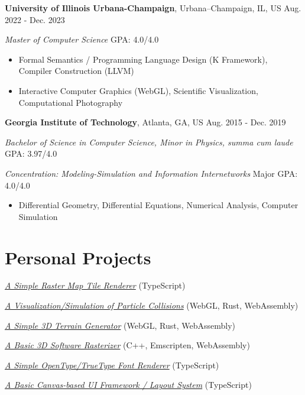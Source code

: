 \documentclass[11pt]{article}
\begin{document}
\textbf{University of Illinois Urbana-Champaign}, Urbana–Champaign, IL, US \hfill Aug. 2022 - Dec. 2023 

\textit{Master of Computer Science}  \hfill GPA: 4.0/4.0 

\begin{itemize}
\item Formal Semantics / Programming Language Design (K Framework), Compiler Construction (LLVM)
\item Interactive Computer Graphics (WebGL), Scientific Visualization, Computational Photography
\end{itemize}

\textbf{Georgia Institute of Technology}, Atlanta, GA, US \hfill Aug. 2015 - Dec. 2019

\textit{Bachelor of Science in Computer Science, Minor in Physics, \textit{summa cum laude}} \hfill GPA: 3.97/4.0

\textit{Concentration: Modeling-Simulation and Information Internetworks} \hfill Major GPA: 4.0/4.0

\begin{itemize}
\item Differential Geometry, Differential Equations, Numerical Analysis, Computer Simulation
\end{itemize}

\section*{Personal Projects}

\href{https://galmungral.github.io/mercator}{\textit{A Simple Raster Map Tile Renderer}} \hfill (TypeScript)

\href{https://galmungral.github.io/particle-simulation}{\textit{A Visualization/Simulation of Particle Collisions}} 
\hfill (WebGL, Rust, WebAssembly)

\href{https://galmungral.github.io/terrain-generator}{\textit{A Simple 3D Terrain Generator}} \hfill (WebGL, Rust, WebAssembly)

\href{https://galmungral.github.io/rasterizer?file=billboard.txt}{\textit{A Basic 3D Software Rasterizer}} \hfill (C++, Emscripten, WebAssembly)

\href{https://galmungral.github.io/text2svg}{\textit{A Simple OpenType/TrueType Font Renderer}} \hfill (TypeScript)

\href{https://galmungral.github.io/michelangelo}{\textit{A Basic Canvas-based UI Framework / Layout System}} \hfill (TypeScript)
\end{document}
